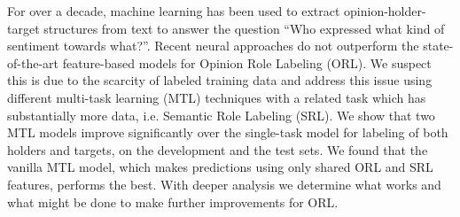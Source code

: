For over a decade, machine learning has been used to extract opinion-holder-target structures from text to answer the question ``Who expressed what kind of sentiment towards what?''. Recent neural approaches do not outperform the state-of-the-art feature-based models for Opinion Role Labeling (ORL). We suspect this is due to the scarcity of labeled training data and address this issue using different multi-task learning (MTL) techniques with a related task which has substantially more data, i.e. Semantic Role Labeling (SRL). We show that two MTL models improve significantly over the single-task model for labeling of both holders and targets, on the development and the test sets. We found that the vanilla MTL model, which makes predictions using only shared ORL and SRL features, performs the best. With deeper analysis we determine what works and what might be done to make further improvements for ORL.
